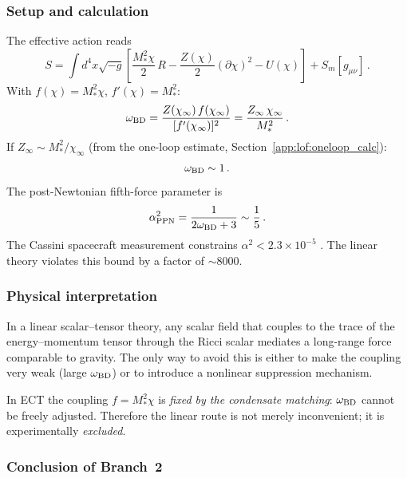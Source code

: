 \documentclass[11pt,a4paper]{article}
\numberwithin{equation}{section}
\begin{document}
\subsubsection{Setup and calculation}

The effective action reads
\begin{equation}
S = \int d^4x\sqrt{-g}\left[
  \frac{M_*^2\chi}{2}\,R
  - \frac{Z(\chi)}{2}(\partial\chi)^2
  - U(\chi)
\right]
+ S_m[g_{\mu\nu}]\,.
\end{equation}
With $f(\chi) = M_*^2\chi$, $f'(\chi) = M_*^2$:
\begin{equation}
\omega_{\rm BD}
= \frac{Z(\chi_\infty)\,f(\chi_\infty)}{[f'(\chi_\infty)]^2}
= \frac{Z_\infty\,\chi_\infty}{M_*^2}\,.
\end{equation}
If $Z_\infty \sim M_*^2/\chi_\infty$
(from the one-loop estimate, Section~\ref{app:lof:oneloop_calc}):
\begin{equation}
\omega_{\rm BD} \sim 1\,.
\end{equation}
The post-Newtonian fifth-force parameter is
\begin{equation}
\alpha_{\rm PPN}^2
= \frac{1}{2\omega_{\rm BD}+3} \sim \frac{1}{5}\,.
\end{equation}
The Cassini spacecraft measurement constrains
$\alpha^2 < 2.3\times10^{-5}$ \cite{Bertotti2003}. The linear
theory violates this bound by a factor of $\sim 8000$.

\subsubsection{Physical interpretation}

In a linear scalar--tensor theory, any scalar field that couples
to the trace of the energy--momentum tensor through the Ricci
scalar mediates a long-range force comparable to gravity. The
only way to avoid this is either to make the coupling very weak
(large $\omega_{\rm BD}$) or to introduce a nonlinear
suppression mechanism.

In ECT the coupling $f = M_*^2\chi$ is \emph{fixed by the
condensate matching}: $\omega_{\rm BD}$ cannot be freely
adjusted. Therefore the linear route is not merely
inconvenient; it is experimentally \emph{excluded}.

\subsubsection{Conclusion of Branch~2}

\begin{center}
\end{center}
\end{document}
